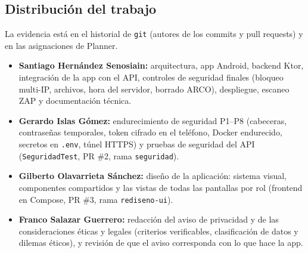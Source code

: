 \subsection{Distribución del trabajo}
La evidencia está en el historial de \texttt{git} (autores de los commits y pull requests) y en las asignaciones de Planner.
\begin{itemize}
	\item \textbf{Santiago Hernández Senosiain:} arquitectura, app Android, backend Ktor, integración de la app con el API, controles de seguridad finales (bloqueo multi-IP, archivos, hora del servidor, borrado ARCO), despliegue, escaneo ZAP y documentación técnica.
	\item \textbf{Gerardo Islas Gómez:} endurecimiento de seguridad P1--P8 (cabeceras, contraseñas temporales, token cifrado en el teléfono, Docker endurecido, secretos en \texttt{.env}, túnel HTTPS) y pruebas de seguridad del API (\texttt{SeguridadTest}, PR \#2, rama \texttt{seguridad}).
	\item \textbf{Gilberto Olavarrieta Sánchez:} diseño de la aplicación: sistema visual, componentes compartidos y las vistas de todas las pantallas por rol (frontend en Compose, PR \#3, rama \texttt{rediseno-ui}).
	\item \textbf{Franco Salazar Guerrero:} redacción del aviso de privacidad y de las consideraciones éticas y legales (criterios verificables, clasificación de datos y dilemas éticos), y revisión de que el aviso corresponda con lo que hace la app.
\end{itemize}

